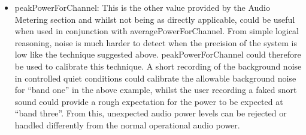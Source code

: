 \begin{itemize}
\item peakPowerForChannel: This is the other value provided by the Audio Metering section and whilst not being as directly applicable, could be useful when used in conjunction with averagePowerForChannel. From simple logical reasoning, noise is much harder to detect when the precision of the system is low like the technique suggested above. peakPowerForChannel could therefore be used to calibrate this technique. A short recording of the background noise in controlled quiet conditions could calibrate the allowable background noise for ``band one'' in the above example, whilst the user recording a faked snort sound could provide a rough expectation for the power to be expected at ``band three''. From this, unexpected audio power levels can be rejected or handled differently from the normal operational audio power.
\end{itemize}